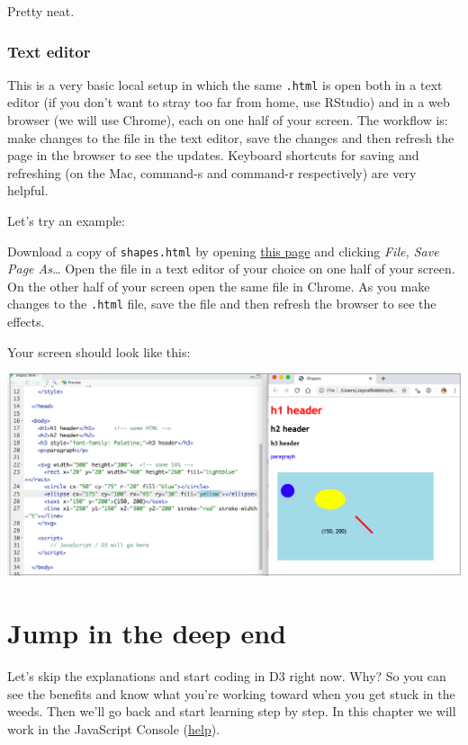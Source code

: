 \documentclass[
  openany]{book}
\begin{document}
Pretty neat.

\hypertarget{text-editor}{%
\subsection{Text editor}\label{text-editor}}

This is a very basic local setup in which the same \texttt{.html} is open both in a text editor (if you don't want to stray too far from home, use RStudio) and in a web browser (we will use Chrome), each on one half of your screen. The workflow is: make changes to the file in the text editor, save the changes and then refresh the page in the browser to see the updates. Keyboard shortcuts for saving and refreshing (on the Mac, command-s and command-r respectively) are very helpful.

Let's try an example:

Download a copy of \texttt{shapes.html} by opening \href{https://raw.githubusercontent.com/jtr13/d3book/master/code/shapes.html}{this page} and clicking \emph{File, Save Page As\ldots{}} Open the file in a text editor of your choice on one half of your screen. On the other half of your screen open the same file in Chrome. As you make changes to the \texttt{.html} file, save the file and then refresh the browser to see the effects.

Your screen should look like this:

\begin{center}\includegraphics[width=0.8\linewidth]{images/editor_chrome} \end{center}

\hypertarget{jump}{%
\chapter{\texorpdfstring{Jump in the deep end }{Jump in the deep end }}\label{jump}}

Let's skip the explanations and start coding in D3 right now. Why? So you can see the benefits and know what you're working toward when you get stuck in the weeds. Then we'll go back and start learning step by step. In this chapter we will work in the JavaScript Console (\href{index.html\#javascript-console}{help}).
\end{document}
